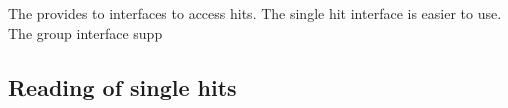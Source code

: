 The \deviceName provides to interfaces to access hits. The single hit interface is easier to use. 
The group interface supp

\subsection{Reading of single hits}